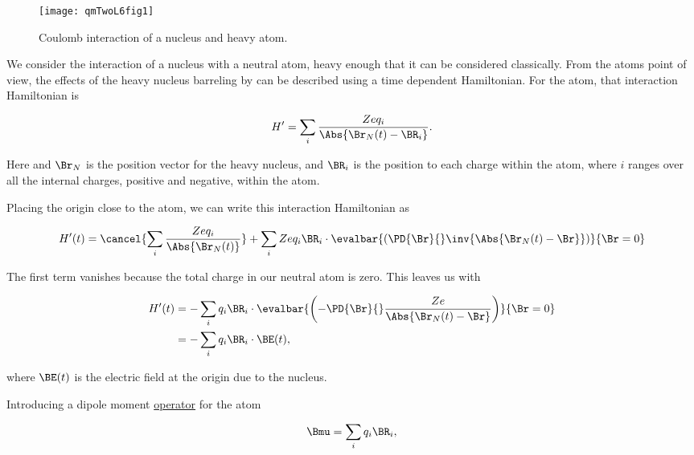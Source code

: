 \begin{figure}[htp]
\centering
\texttt{[image: qmTwoL6fig1]}
\caption{Coulomb interaction of a nucleus and heavy atom.}\label{fig:qmTwoL6fig1}
\end{figure}

We consider the interaction of a nucleus with a neutral atom, heavy enough that it can be considered classically.  From the atoms point of view, the effects of the heavy nucleus barreling by can be described using a time dependent Hamiltonian.  For the atom, that interaction Hamiltonian is

\begin{equation}\label{eqn:qmTwoL6:10}
H' = \sum_i \frac{ Z e q_i }{\Abs{\Br_N(t) - \BR_i}}.
\end{equation}

Here and $\Br_N$ is the position vector for the heavy nucleus, and $\BR_i$ is the position to each charge within the atom, where $i$ ranges over all the internal charges, positive and negative, within the atom.

Placing the origin close to the atom, we can write this interaction Hamiltonian as

\begin{equation}\label{eqn:qmTwoL6:30}
H'(t) = \cancel{\sum_i \frac{Z e q_i}{\Abs{\Br_N(t)}}}
+ \sum_i Z e q_i \BR_i \cdot 
\evalbar{\left(
\PD{\Br}{} \inv{\Abs{ \Br_N(t) - \Br}}
\right)}{\Br = 0}
\end{equation}

The first term vanishes because the total charge in our neutral atom is zero.  This leaves us with

\begin{equation}\label{eqn:qmTwoL6:50}
\begin{aligned}
H'(t) 
&= 
-\sum_i q_i \BR_i \cdot \evalbar{\left(
-\PD{\Br}{} \frac{ Z e}{\Abs{ \Br_N(t) - \Br}}
\right)}{\Br = 0} \\
&= - \sum_i q_i \BR_i \cdot \BE(t),
\end{aligned}
\end{equation}

where $\BE(t)$ is the electric field at the origin due to the nucleus.

Introducing a dipole moment \underline{operator} for the atom

\begin{equation}\label{eqn:qmTwoL6:70}
\Bmu = \sum_i q_i \BR_i,
\end{equation}

